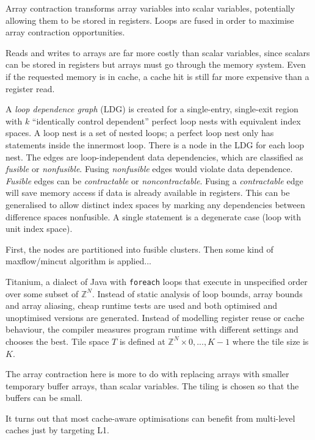 Array contraction transforms array variables into scalar variables,
potentially allowing them to be stored in registers.
Loops are fused in order to maximise array contraction opportunities.

Reads and writes to arrays are far more costly than scalar variables, since
scalars can be stored in registers but arrays must go through the memory system.
Even if the requested memory is in cache, a cache hit is still far more expensive than a register read.

A \emph{loop dependence graph} (LDG) is created for a single-entry, single-exit region with $k$ ``identically control dependent'' perfect loop nests with equivalent index spaces.
A loop nest is a set of nested loops; a perfect loop nest only has statements inside the innermost loop.
There is a node in the LDG for each loop nest.
The edges are loop-independent data dependencies, which are classified as \emph{fusible} or \emph{nonfusible}.
Fusing \emph{nonfusible} edges would violate data dependence. \emph{Fusible} edges can be \emph{contractable} or \emph{noncontractable}.
Fusing a \emph{contractable} edge will save memory access if data is already available in registers.
This can be generalised to allow distinct index spaces by marking any dependencies between difference spaces nonfusible. A single statement is a degenerate case (loop with unit index space).

First, the nodes are partitioned into fusible clusters. Then some kind of maxflow/mincut algorithm is applied...


Titanium, a dialect of Java with {\tt foreach} loops that execute in unspecified order over some subset of $\mathbb{Z}^N$.
Instead of static analysis of loop bounds, array bounds and array aliasing, cheap runtime tests are used
and both optimised and unoptimised versions are generated.
Instead of modelling register reuse or cache behaviour, the compiler measures program runtime with different settings and chooses the best.
Tile space $T$ is defined at $\mathbb{Z}^N \times {0, ... , K - 1}$ where the tile size is $K$.

The array contraction here is more to do with replacing arrays with smaller temporary buffer arrays, than scalar variables.
The tiling is chosen so that the buffers can be small.

It turns out that most cache-aware optimisations can benefit from multi-level caches just by targeting L1.

